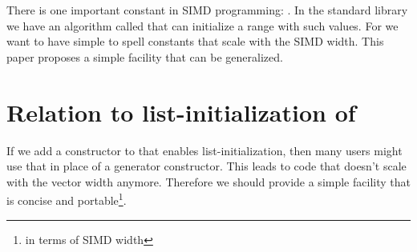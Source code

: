 \newcommand\wgTitle{Add an iota object for simd (and more)}
\newcommand\wgName{Matthias Kretz <m.kretz@gsi.de>}
\newcommand\wgDocumentNumber{P3319R6}
\newcommand\wgGroup{LWG}
\newcommand\wgTarget{\CC{}29}

\usepackage{mymacros}
\usepackage{wg21}
\setcounter{tocdepth}{2} %
\hypersetup{bookmarksdepth=5}
\usepackage{changelog}
\usepackage{underscore}
\usepackage{multirow}



\newcommand\simd[1][]{\type{ba\-sic\_simd#1}\xspace}
\newcommand\simdT{\type{ba\-sic\_simd\MayBreak<\MayBreak{}T>}\xspace}
\newcommand\valuetype{\type{val\-ue\_type}\xspace}
\newcommand\referencetype{\type{ref\-er\-ence}\xspace}
\newcommand\mask[1][]{\type{ba\-sic\_simd\_mask#1}\xspace}
\newcommand\maskT{\type{ba\-sic\_simd\_mask\MayBreak<\MayBreak{}T>}\xspace}
\newcommand\wglink[1]{\href{https://wg21.link/#1}{#1}}

\newcommand\nativeabi{\UNSP{native-abi}}
\newcommand\deducet{\UNSP{deduce-t}}
\newcommand\simdsizev{\UNSP{simd-size-v}}
\newcommand\simdsizetype{\UNSP{simd-size-type}}
\newcommand\simdselect{\UNSP{simd-select-impl}}
\newcommand\maskelementsize{\UNSP{mask-element-size}}
\newcommand\integerfrom{\UNSP{integer-from}}
\newcommand\constexprwrapperlike{\UNSP{constexpr-wrapper-like}}

\renewcommand{\lst}[1]{Listing~\ref{#1}}
\renewcommand{\sect}[1]{Section~\ref{#1}}
\renewcommand{\ttref}[1]{Tony~Table~\ref{#1}}
\renewcommand{\tabref}[1]{Table~\ref{#1}}


\begin{wgTitlepage}
  There is one important constant in SIMD programming: . In the standard library we have an algorithm called  that
  can initialize a range with such values. For  we want to have
  simple to spell constants that scale with the SIMD width. This paper proposes
  a simple facility that can be generalized.
\end{wgTitlepage}

\pagestyle{scrheadings}








\section{Relation to list-initialization of }
If we add a constructor to \simd that enables list-initialization, then many
users might use that in place of a generator constructor.
This leads to code that doesn't scale with the vector width anymore.
Therefore we should provide a simple facility that is concise and
portable\footnote{in terms of SIMD width}.

